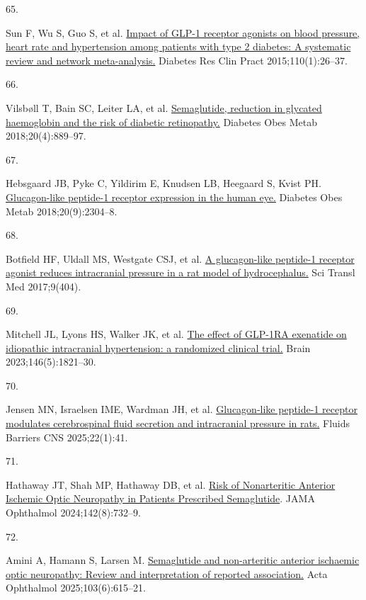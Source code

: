 \documentclass[
  11pt,
]{article}
\newlength{\cslhangindent}
\newlength{\csllabelwidth}
\newenvironment{CSLReferences}[2] %
 {\begin{list}{}{%
  \setlength{\itemindent}{0pt}
  \setlength{\leftmargin}{0pt}
  \setlength{\parsep}{0pt}
  \ifodd #1
   \setlength{\leftmargin}{\cslhangindent}
   \setlength{\itemindent}{-1\cslhangindent}
  \fi
  \setlength{\itemsep}{#2\baselineskip}}}
 {\end{list}}
\newcommand{\CSLLeftMargin}[1]{\parbox[t]{\csllabelwidth}{\strut#1\strut}}
\newcommand{\CSLRightInline}[1]{\parbox[t]{\linewidth - \csllabelwidth}{\strut#1\strut}}
\begin{document}
\begin{CSLReferences}{0}{1}
\CSLLeftMargin{65. }%
\CSLRightInline{Sun F, Wu S, Guo S, et al.
\href{https://doi.org/10.1016/j.diabres.2015.07.015}{{Impact of GLP-1
receptor agonists on blood pressure, heart rate and hypertension among
patients with type 2 diabetes: A systematic review and network
meta-analysis.}} Diabetes Res Clin Pract 2015;110(1):26--37. }

\CSLLeftMargin{66. }%
\CSLRightInline{Vilsbøll T, Bain SC, Leiter LA, et al.
\href{https://doi.org/10.1111/dom.13172}{{Semaglutide, reduction in
glycated haemoglobin and the risk of diabetic retinopathy.}} Diabetes
Obes Metab 2018;20(4):889--97. }

\CSLLeftMargin{67. }%
\CSLRightInline{Hebsgaard JB, Pyke C, Yildirim E, Knudsen LB, Heegaard
S, Kvist PH. \href{https://doi.org/10.1111/dom.13339}{{Glucagon-like
peptide-1 receptor expression in the human eye.}} Diabetes Obes Metab
2018;20(9):2304--8. }

\CSLLeftMargin{68. }%
\CSLRightInline{Botfield HF, Uldall MS, Westgate CSJ, et al.
\href{https://doi.org/10.1126/scitranslmed.aan0972}{{A glucagon-like
peptide-1 receptor agonist reduces intracranial pressure in a rat model
of hydrocephalus.}} Sci Transl Med 2017;9(404). }

\CSLLeftMargin{69. }%
\CSLRightInline{Mitchell JL, Lyons HS, Walker JK, et al.
\href{https://doi.org/10.1093/brain/awad003}{{The effect of GLP-1RA
exenatide on idiopathic intracranial hypertension: a randomized clinical
trial.}} Brain 2023;146(5):1821--30. }

\CSLLeftMargin{70. }%
\CSLRightInline{Jensen MN, Israelsen IME, Wardman JH, et al.
\href{https://doi.org/10.1186/s12987-025-00652-x}{{Glucagon-like
peptide-1 receptor modulates cerebrospinal fluid secretion and
intracranial pressure in rats.}} Fluids Barriers CNS 2025;22(1):41. }

\CSLLeftMargin{71. }%
\CSLRightInline{Hathaway JT, Shah MP, Hathaway DB, et al.
\href{https://doi.org/10.1001/jamaophthalmol.2024.2296}{{Risk of
Nonarteritic Anterior Ischemic Optic Neuropathy in Patients Prescribed
Semaglutide}}. JAMA Ophthalmol 2024;142(8):732--9. }

\CSLLeftMargin{72. }%
\CSLRightInline{Amini A, Hamann S, Larsen M.
\href{https://doi.org/10.1111/aos.17473}{{Semaglutide and non-arteritic
anterior ischaemic optic neuropathy: Review and interpretation of
reported association.}} Acta Ophthalmol 2025;103(6):615--21. }


\end{CSLReferences}
\end{document}
